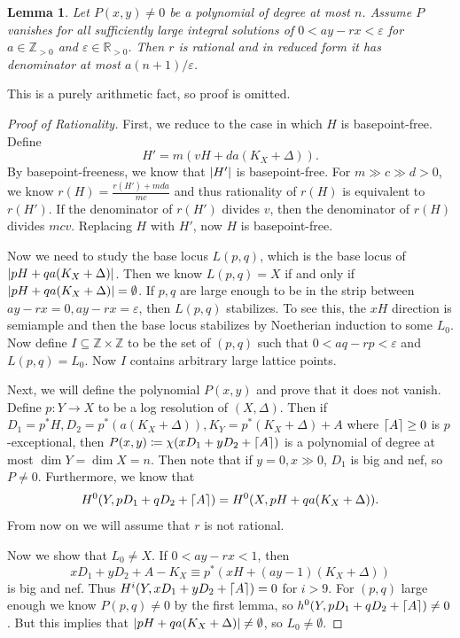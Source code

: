 \documentclass[leqno, openany]{memoir}
\DeclarePairedDelimiter{\ceil}{\lceil}{\rceil}
\newtheorem{lem}[thm]{Lemma}
\theoremstyle{definition}
\theoremstyle{remark}
\theoremstyle{plain}
\theoremstyle{definition}
\theoremstyle{remark}
\newcommand{\R}{\mathbb{R}}
\newcommand{\Z}{\mathbb{Z}}
\newcommand{\ep}{\varepsilon}
\begin{document}
\begin{lem}
    Let $P(x,y) \neq 0$ be a polynomial of degree at most $n$. Assume $P$ vanishes for all sufficiently large integral solutions of $0 < ay - rx < \ep$ for $a \in \Z_{>0}$ and $\ep \in \R_{>0}$. Then $r$ is rational and in reduced form it has denominator at most $a(n+1)/\ep$.
\end{lem}

This is a purely arithmetic fact, so proof is omitted.

\begin{proof}[Proof of Rationality]
    First, we reduce to the case in which $H$ is basepoint-free. Define
    \[ H' = m (vH + da (K_X + \Delta)). \]
    By basepoint-freeness, we know that $\abs{H'}$ is basepoint-free. For $m \gg c \gg d > 0$, we know $r(H) = \frac{r(H') + mda}{mc}$ and thus rationality of $r(H)$ is equivalent to $r(H')$. If the denominator of $r(H')$ divides $v$, then the denominator of $r(H)$ divides $mcv$. Replacing $H$ with $H'$, now $H$ is basepoint-free.

    Now we need to study the base locus $L(p,q)$, which is the base locus of $\abs{pH + qa (K_X + \Delta)}$. Then we know $L(p,q) = X$ if and only if $\abs{pH + qa(K_X + \Delta)} = \emptyset$. If $p,q$ are large enough to be in the strip between $ay - rx = 0, ay - rx = \ep$, then $L(p,q)$ stabilizes. To see this, the $xH$ direction is semiample and then the base locus stabilizes by Noetherian induction to some $L_0$. Now define $I \subseteq \Z \times \Z$ to be the set of $(p,q)$ such that $0 < aq-rp < \ep$ and $L(p,q) = L_0$. Now $I$ contains arbitrary large lattice points.

    Next, we will define the polynomial $P(x,y)$ and prove that it does not vanish. Define $p \colon Y \to X$ to be a log resolution of $(X, \Delta)$. Then if $D_1 = p^*H, D_2 = p^* (a(K_X + \Delta)), K_Y = p^*(K_X + \Delta) + A$ where $\ceil{A} \geq 0$ is $p$-exceptional, then $P(x,y) \coloneqq \chi(x D_1 + y D_2 + \ceil{A})$ is a polynomial of degree at most $\dim Y = \dim X = n$. Then note that if $y = 0, x \gg 0$, $D_1$ is big and nef, so $P \neq 0$. Furthermore, we know that 
    \[ H^0(Y, pD_1 + q D_2 + \ceil{A}) = H^0(X, pH + qa(K_X + \Delta)). \]
    From now on we will assume that $r$ is not rational.

    Now we show that $L_0 \neq X$. If $0 < ay-rx < 1$, then
    \[ x D_1 + yD_2 + A - K_X \equiv p^* (xH + (ay-1)(K_X + \Delta)) \]
    is big and nef. Thus $H^i(Y, xD_1 + yD_2 + \ceil{A}) = 0$ for $i > 9$. For $(p,q)$ large enough we know $P(p,q) \neq 0$ by the first lemma, so $h^0(Y, pD_1 + qD_2 + \ceil{A}) \neq 0$. But this implies that $\abs{pH + qa(K_X + \Delta)} \neq \emptyset$, so $L_0 \neq \emptyset$.


\end{proof}
\end{document}

